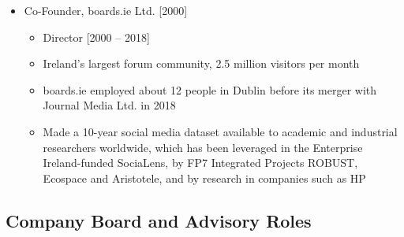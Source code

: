 \documentclass[10pt,a4paper]{res} %
\begin{document}
\begin{resume}
\begin{itemize}
\item Co-Founder, boards.ie Ltd. [2000]
\begin{itemize} \itemsep -2pt
\item Director [2000 -- 2018]
\item Ireland's largest forum community, 2.5 million visitors per month
\item boards.ie employed about 12 people in Dublin before its merger with Journal Media Ltd. in 2018
\item Made a 10-year social media dataset available to academic and industrial researchers worldwide, which has been leveraged in the Enterprise Ireland-funded SociaLens, by FP7 Integrated Projects ROBUST, Ecospace and Aristotele, and by research in companies such as HP
\end{itemize}
\end{itemize}

\subsection*{Company Board and Advisory Roles}


\end{resume}
\end{document}
